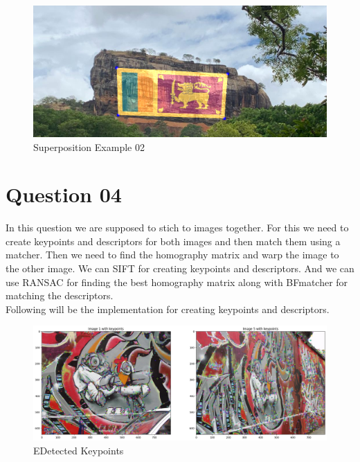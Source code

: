 \documentclass[11pt,a4paper]{article}
\begin{document}
{\begin{figure}[h]
    \centering
    \includegraphics[width=1.0\linewidth]{images/4.png}
    \caption{Superposition Example 02}
\end{figure}}


\section{Question 04}

In this question we are supposed to stich to images together. For this we need to create keypoints and descriptors for both images and then match them using a matcher. Then we need to find the homography matrix and warp the image to the other image. We can SIFT for creating keypoints and descriptors. And we can use RANSAC for finding the best homography matrix along with BFmatcher for matching the descriptors.\\

Following will be the implementation for creating keypoints and descriptors.

\lstset{style=mystyle}


\newpage

{\begin{figure}[h]
    \centering
    \includegraphics[width=1.0\linewidth]{images/5.png}
    \caption{EDetected Keypoints}
\end{figure}}
\end{document}
